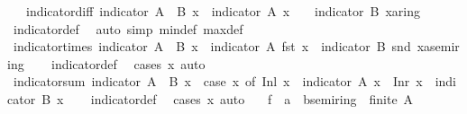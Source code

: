 \begin{isabellebody}
\ \ \ indicator{\isacharunderscore}diff{\isacharcolon}\ {\isachardoublequoteopen}indicator\ {\isacharparenleft}A\ {\isacharminus}\ B{\isacharparenright}\ x\ {\isacharequal}\ indicator\ A\ x\ {\isacharasterisk}\ {\isacharparenleft}{}\ {\isacharminus}\ indicator\ B\ x{\isacharcolon}{\isacharcolon}{\isacharprime}a{\isacharcolon}{\isacharcolon}ring{\isacharunderscore}{}{\isacharparenright}{\isachardoublequoteclose}\isanewline
%
\isadelimproof
\ \ %
\endisadelimproof
%
\isatagproof
{}\isamarkupfalse%
\ indicator{\isacharunderscore}def\ \isamarkupfalse%
\ {\isacharparenleft}auto\ simp{\isacharcolon}\ min{\isacharunderscore}def\ max{\isacharunderscore}def{\isacharparenright}%
\endisatagproof
{\isafoldproof}%
%
\isadelimproof
\isanewline
%
\endisadelimproof
\isanewline
{}\isamarkupfalse%
\ indicator{\isacharunderscore}times{\isacharcolon}\ {\isachardoublequoteopen}indicator\ {\isacharparenleft}A\ {\isasymtimes}\ B{\isacharparenright}\ x\ {\isacharequal}\ indicator\ A\ {\isacharparenleft}fst\ x{\isacharparenright}\ {\isacharasterisk}\ {\isacharparenleft}indicator\ B\ {\isacharparenleft}snd\ x{\isacharparenright}{\isacharcolon}{\isacharcolon}{\isacharprime}a{\isacharcolon}{\isacharcolon}semiring{\isacharunderscore}{}{\isacharparenright}{\isachardoublequoteclose}\isanewline
%
\isadelimproof
\ \ %
\endisadelimproof
%
\isatagproof
{}\isamarkupfalse%
\ indicator{\isacharunderscore}def\ \isamarkupfalse%
\ {\isacharparenleft}cases\ x{\isacharparenright}\ auto%
\endisatagproof
{\isafoldproof}%
%
\isadelimproof
\isanewline
%
\endisadelimproof
\isanewline
{}\isamarkupfalse%
\ indicator{\isacharunderscore}sum{\isacharcolon}\ {\isachardoublequoteopen}indicator\ {\isacharparenleft}A\ {\isacharless}{\isacharplus}{\isachargreater}\ B{\isacharparenright}\ x\ {\isacharequal}\ {\isacharparenleft}case\ x\ of\ Inl\ x\ {\isasymRightarrow}\ indicator\ A\ x\ {\isacharbar}\ Inr\ x\ {\isasymRightarrow}\ indicator\ B\ x{\isacharparenright}{\isachardoublequoteclose}\isanewline
%
\isadelimproof
\ \ %
\endisadelimproof
%
\isatagproof
{}\isamarkupfalse%
\ indicator{\isacharunderscore}def\ \isamarkupfalse%
\ {\isacharparenleft}cases\ x{\isacharparenright}\ auto%
\endisatagproof
{\isafoldproof}%
%
\isadelimproof
\isanewline
%
\endisadelimproof
\isanewline
{}\isamarkupfalse%
\isanewline
\ \ \ f\ {\isacharcolon}{\isacharcolon}\ {\isachardoublequoteopen}{\isacharprime}a\ {\isasymRightarrow}\ {\isacharprime}b{\isacharcolon}{\isacharcolon}semiring{\isacharunderscore}{}{\isachardoublequoteclose}\ \ {\isachardoublequoteopen}finite\ A{\isachardoublequoteclose}\isanewline

\end{isabellebody}
